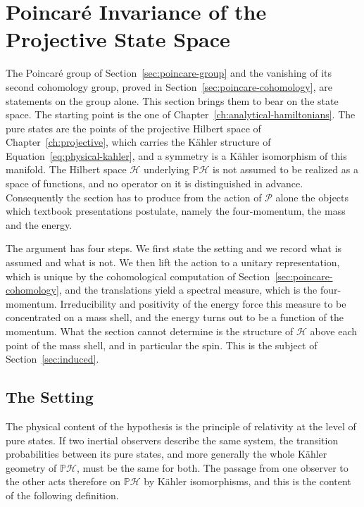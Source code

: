 	\section{Poincar\'e Invariance of the Projective State Space}
	\label{sec:poincare-lift}
	
	The Poincar\'e group of Section~\ref{sec:poincare-group} and the vanishing of its second cohomology group, proved in Section~\ref{sec:poincare-cohomology}, are statements on the group alone. This section brings them to bear on the state space. The starting point is the one of Chapter~\ref{ch:analytical-hamiltonians}. The pure states are the points of the projective Hilbert space of Chapter~\ref{ch:projective}, which carries the Kähler structure of Equation~\eqref{eq:physical-kahler}, and a symmetry is a Kähler isomorphism of this manifold. The Hilbert space $\mathcal{H}$ underlying $\mathbb{P}\mathcal{H}$ is not assumed to be realized as a space of functions, and no operator on it is distinguished in advance. Consequently the section has to produce from the action of $\mathcal{P}$ alone the objects which textbook presentations postulate, namely the four-momentum, the mass and the energy.
	
	The argument has four steps. We first state the setting and we record what is assumed and what is not. We then lift the action to a unitary representation, which is unique by the cohomological computation of Section~\ref{sec:poincare-cohomology}, and the translations yield a spectral measure, which is the four-momentum. Irreducibility and positivity of the energy force this measure to be concentrated on a mass shell, and the energy turns out to be a function of the momentum. What the section cannot determine is the structure of $\mathcal{H}$ above each point of the mass shell, and in particular the spin. This is the subject of Section~\ref{sec:induced}.
	
	\subsection{The Setting}\label{subsec:poincare-setting}
	
	The physical content of the hypothesis is the principle of relativity at the level of pure states. If two inertial observers describe the same system, the transition probabilities between its pure states, and more generally the whole Kähler geometry of $\mathbb{P}\mathcal{H}$, must be the same for both. The passage from one observer to the other acts therefore on $\mathbb{P}\mathcal{H}$ by Kähler isomorphisms, and this is the content of the following definition.
	

